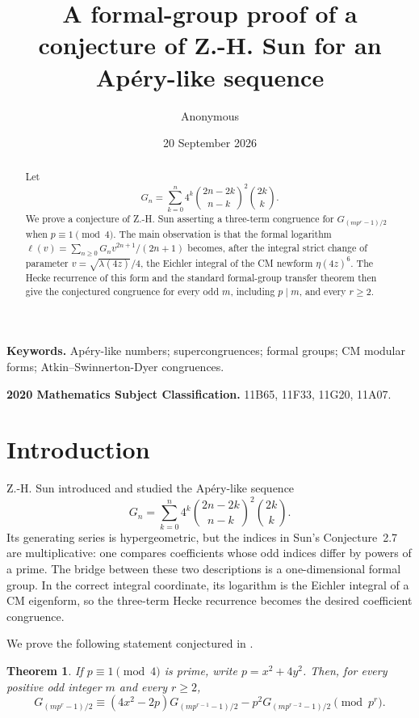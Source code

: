 \documentclass[11pt]{article}
\title{A formal-group proof of a conjecture of Z.-H. Sun for an Ap\'ery-like sequence}
\author{Anonymous}
\date{20 September 2026}
\newtheorem{theorem}{Theorem}[section]
\theoremstyle{remark}
\begin{document}
\maketitle

\begin{abstract}
Let
\[
G_n=\sum_{k=0}^n4^k\binom{2n-2k}{n-k}^{2}\binom{2k}{k}.
\]
We prove a conjecture of Z.-H. Sun asserting a three-term congruence for
$G_{(mp^r-1)/2}$ when $p\equiv1\pmod4$.  The main observation is that the
formal logarithm
\(
\ell(v)=\sum_{n\ge0}G_nv^{2n+1}/(2n+1)
\)
becomes, after the integral strict change of parameter
$v=\sqrt{\lambda(4z)}/4$, the Eichler integral of the CM newform
$\eta(4z)^6$.  The Hecke recurrence of this form and the standard
formal-group transfer theorem then give the conjectured congruence for every
odd $m$, including $p\mid m$, and every $r\ge2$.
\end{abstract}

\noindent\textbf{Keywords.} Ap\'ery-like numbers; supercongruences; formal
groups; CM modular forms; Atkin--Swinnerton-Dyer congruences.

\noindent\textbf{2020 Mathematics Subject Classification.} 11B65, 11F33,
11G20, 11A07.

\section{Introduction}

Z.-H. Sun introduced and studied the Ap\'ery-like sequence
\begin{equation}\label{eq:Gdef}
G_n=\sum_{k=0}^n4^k\binom{2n-2k}{n-k}^{2}\binom{2k}{k}.
\end{equation}
Its generating series is hypergeometric, but the indices in Sun's
Conjecture~2.7 are multiplicative: one compares coefficients whose odd
indices differ by powers of a prime.  The bridge between these two
descriptions is a one-dimensional formal group.  In the correct integral
coordinate, its logarithm is the Eichler integral of a CM eigenform, so the
three-term Hecke recurrence becomes the desired coefficient congruence.

We prove the following statement conjectured in \cite{Sun2020}.

\begin{theorem}\label{thm:main}
If $p\equiv1\pmod4$ is prime, write $p=x^2+4y^2$.  Then, for every positive
odd integer $m$ and every $r\ge2$,
\begin{equation}\label{eq:Sun}
G_{(mp^r-1)/2}\equiv(4x^2-2p)G_{(mp^{r-1}-1)/2}
-p^2G_{(mp^{r-2}-1)/2}\pmod {p^r}.
\end{equation}
\end{theorem}
\end{document}
